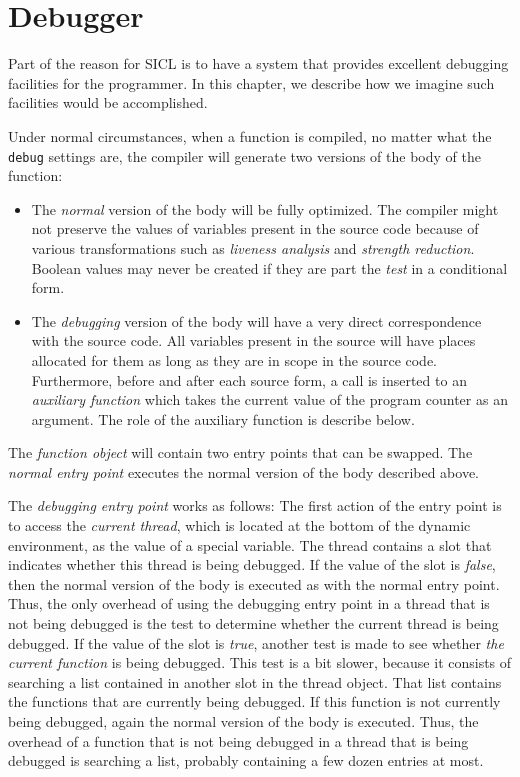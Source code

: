 \chapter{Debugger}
\label{chap-debugger}

Part of the reason for SICL is to have a system that provides
excellent debugging facilities for the programmer.  In this chapter,
we describe how we imagine such facilities would be accomplished.  

Under normal circumstances, when a function is compiled, no matter
what the \texttt{debug} settings are, the compiler will generate two
versions of the body of the function:

\begin{itemize}
\item The \emph{normal} version of the body will be fully optimized.
  The compiler might not preserve the values of variables present in
  the source code because of various transformations such as
  \emph{liveness analysis} and \emph{strength reduction}.  Boolean
  values may never be created if they are part the \emph{test} in a
  conditional form.
\item The \emph{debugging} version of the body will have a very direct
  correspondence with the source code.  All variables present in the
  source will have places allocated for them as long as they are in
  scope in the source code.  Furthermore, before and after each source
  form, a call is inserted to an \emph{auxiliary function} which takes
  the current value of the program counter as an argument.  The role
  of the auxiliary function is describe below.
\end{itemize}

The \emph{function object} will contain two entry points that can be
swapped.  The \emph{normal entry point} executes the normal version of
the body described above.

The \emph{debugging entry point} works as follows: The first action of
the entry point is to access the \emph{current thread}, which is
located at the bottom of the dynamic environment, as the value of a
special variable.  The thread contains a slot that indicates whether
this thread is being debugged.  If the value of the slot is
\emph{false}, then the normal version of the body is executed as with
the normal entry point.  Thus, the only overhead of using the
debugging entry point in a thread that is not being debugged is the
test to determine whether the current thread is being debugged.  If
the value of the slot is \emph{true}, another test is made to see
whether \emph{the current function} is being debugged.  This test is a
bit slower, because it consists of searching a list contained in
another slot in the thread object.  That list contains the functions
that are currently being debugged.  If this function is not currently
being debugged, again the normal version of the body is executed.
Thus, the overhead of a function that is not being debugged in a
thread that is being debugged is searching a list, probably containing
a few dozen entries at most.

